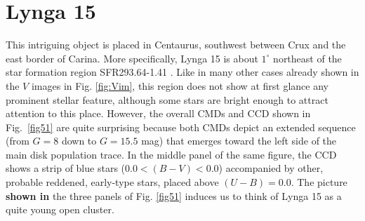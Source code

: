 \documentclass[draft]{aa}
\begin{document}
\section{Lynga 15}

This intriguing object is placed in Centaurus, southwest between Crux and
the east border of Carina. More specifically, Lynga 15 is about $1^\circ$
northeast of the star formation region SFR293.64-1.41 \citep{Avedisova_2002}.
Like in many other cases already shown in the $V$ images in Fig. \ref{fig:Vim},
this region does not show at first glance any prominent stellar feature,
although some stars are bright enough to attract attention to this place.
%
However, the overall CMDs and CCD shown in Fig.~\ref{fig51}
are quite surprising because both CMDs depict an extended sequence (from $G=8$
down to $G=15.5$ mag) that emerges toward the left side of the main disk population
trace. In the middle panel of the same figure, the CCD shows a strip of blue stars
($0.0<(B-V)<0.0$) accompanied by other, probable reddened, early-type stars,
placed above $(U-B) = 0.0$. The picture \textbf{shown in} the three panels of Fig.
\ref{fig51} induces us to think of Lynga 15 as a quite young open cluster.\\
\end{document}

